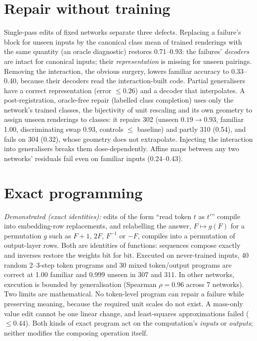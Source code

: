 \documentclass[11pt]{article}
\begin{document}
\section{Repair without training}\label{sec:repair}
Single-pass edits of fixed networks separate three defects. Replacing a failure's block for unseen inputs by the
canonical class mean of trained renderings with the same quantity (an oracle diagnostic) restores 0.71--0.93: the
failures' \emph{decoders} are intact for canonical inputs; their \emph{representation} is missing for unseen
pairings. Removing the interaction, the obvious surgery, lowers familiar accuracy to 0.33--0.40, because their decoders
read the interaction-built code. Partial generalisers have a correct representation (error $\le0.26$) and a decoder
that interpolates. A post-registration, oracle-free repair (labelled class completion) uses only the network's trained
classes, the bijectivity of unit rescaling and its own geometry to assign unseen renderings to classes: it repairs 302
(unseen $0.19\to0.93$, familiar 1.00, discriminating swap 0.93, controls $\le$ baseline) and partly 310 (0.54), and
fails on 304 (0.32), whose geometry does not extrapolate. Injecting the interaction into generalisers breaks them
dose-dependently. Affine maps between any two networks' residuals fail even on familiar inputs (0.24--0.43).

\section{Exact programming}\label{sec:program}
\emph{Demonstrated (exact identities):} edits of the form ``read token $t$ as $t'$'' compile into embedding-row
replacements, and relabelling the answer, $F\mapsto g(F)$ for a permutation $g$ such as $F+1$, $2F$, $F^{-1}$ or $-F$,
compiles into a permutation of output-layer rows. Both are identities of functions: sequences compose exactly and
inverses restore the weights bit for bit. Executed on never-trained inputs, 40 random 2--3-step token programs and 30
mixed token/output programs are correct at 1.00 familiar and 0.999 unseen in 307 and 311. In other networks, execution
is bounded by generalisation (Spearman $\rho=0.96$ across 7 networks). Two limits are mathematical. No token-level
program can repair a failure while preserving meaning, because the required unit scales do not exist. A mass-only value
edit cannot be one linear change, and least-squares approximations failed ($\le0.44$). Both kinds of exact program act
on the computation's \emph{inputs} or \emph{outputs}; neither modifies the composing operation itself.
\end{document}

